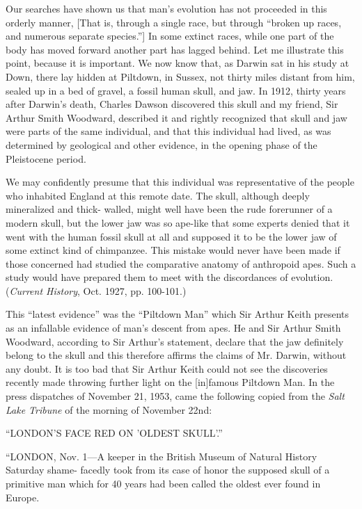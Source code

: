 Our searches have shown us that man's evolution has not proceeded in this orderly manner,
[That is, through a single race, but through ``broken up races, and numerous separate
species.''] In some extinct races, while one part of the body has moved forward another part
has lagged behind. Let me illustrate this point, because it is important. We now know that, as
Darwin sat in his study at Down, there lay hidden at Piltdown, in Sussex, not thirty miles
distant from him, sealed up in a bed of gravel, a fossil human skull, and jaw. In 1912, thirty
years after Darwin's death, Charles Dawson discovered this skull and my friend, Sir Arthur
Smith Woodward, described it and rightly recognized that skull and jaw were parts of the
same individual, and that this individual had lived, as was determined by geological and
other evidence, in the opening phase of the Pleistocene period.

We may confidently presume that this individual was representative of the people who
inhabited England at this remote date. The skull, although deeply mineralized and thick-
walled, might well have been the rude forerunner of a modern skull, but the lower jaw was so
ape-like that some experts denied that it went with the human fossil skull at all and supposed
it to be the lower jaw of some extinct kind of chimpanzee. This mistake would never have
been made if those concerned had studied the comparative anatomy of anthropoid apes. Such
a study would have prepared them to meet with the discordances of evolution. (\textit{Current
History}, Oct. 1927, pp. 100-101.)

This ``latest evidence'' was the ``Piltdown Man'' which Sir Arthur Keith presents as an
infallable evidence of man's descent from apes. He and Sir Arthur Smith Woodward,
according to Sir Arthur's statement, declare that the jaw definitely belong to the skull and this
therefore affirms the claims of Mr. Darwin, without any doubt. It is too bad that Sir Arthur
Keith could not see the discoveries recently made throwing further light on the [in]famous
Piltdown Man. In the press dispatches of November 21, 1953, came the following copied
from the \textit{Salt Lake Tribune} of the morning of November 22nd:

``LONDON'S FACE RED ON 'OLDEST SKULL'.''

``LONDON, Nov. 1—A keeper in the British Museum of Natural History Saturday shame-
facedly took from its case of honor the supposed skull of a primitive man which for 40 years
had been called the oldest ever found in Europe.

